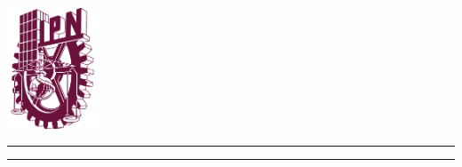\documentclass[
11pt, %
spanish, %
singlespacing, %
headsepline, %
]{MastersDoctoralThesis} %
\author{Adrián Juárez Monroy} %
\begin{document}
\frontmatter %

\pagestyle{plain} %


\begin{titlepage}
    \thispagestyle{empty}
    \setlength{\headheight}{0pt}
    \begin{minipage}[c][0.17\textheight][c]{0.22\textwidth}
        \begin{center}
            \includegraphics[width=2.7cm]{Figuras/logo-ipn.png}
        \end{center}
    \end{minipage}
    \begin{minipage}[c][0.195\textheight][t]{0.73\textwidth}
        \begin{center}
            \vspace{0.3cm}
            \textsc{\Large \univname}
            \vspace{0.8cm}
            \hrule height 2.5pt
            \vspace{0.2cm}
            \hrule height 1pt
            \vspace{0.8cm}
            \textsc{\facname\\
            \deptname}
        \end{center}
    \end{minipage}


\end{titlepage}
\end{document}
